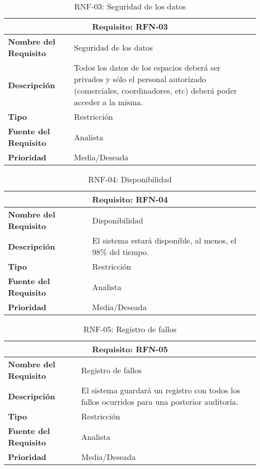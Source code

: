 \begin{table}[H]
\begin{center}
\begin{tabular}{p{} p{7cm}}
\multicolumn{2}{c}{\textbf{Requisito: RFN-03} } \\
\hline \hline
\textbf{Nombre del Requisito} & Seguridad de los datos  \\
\hline
\textbf{Descripción} & Todos los datos de los espacios deberá ser privados y sólo el personal autorizado (comerciales, coordinadores, etc) deberá poder acceder a la misma. \\
\hline
\textbf{Tipo} & Restricción \\
\hline
\textbf{Fuente del Requisito} &  Analista \\
\hline
\textbf{Prioridad} &  Media/Deseada \\ \hline
\end{tabular}
\caption{RNF-03: Seguridad de los datos}
\label{tab:RFN-03}
\end{center}
\end{table}

\begin{table}[H]
\begin{center}
\begin{tabular}{p{} p{7cm}}
\multicolumn{2}{c}{\textbf{Requisito: RFN-04} } \\
\hline \hline
\textbf{Nombre del Requisito} & Disponibilidad  \\
\hline
\textbf{Descripción} & El sistema estará disponible, al menos, el 98\% del tiempo. \\
\hline
\textbf{Tipo} & Restricción \\
\hline
\textbf{Fuente del Requisito} &  Analista \\
\hline
\textbf{Prioridad} &  Media/Deseada \\ \hline
\end{tabular}
\caption{RNF-04: Disponibilidad}
\label{tab:RFN-04}
\end{center}
\end{table}

\begin{table}[H]
\begin{center}
\begin{tabular}{p{} p{7cm}}
\multicolumn{2}{c}{\textbf{Requisito: RFN-05} } \\
\hline \hline
\textbf{Nombre del Requisito} &  Registro de fallos \\
\hline
\textbf{Descripción} & El sistema guardará un registro con todos los fallos ocurridos para una posterior auditoría.\\
\hline
\textbf{Tipo} & Restricción \\
\hline
\textbf{Fuente del Requisito} &  Analista \\
\hline
\textbf{Prioridad} &  Media/Deseada \\ \hline
\end{tabular}
\caption{RNF-05: Registro de fallos}
\label{tab:RFN-05}
\end{center}
\end{table}


